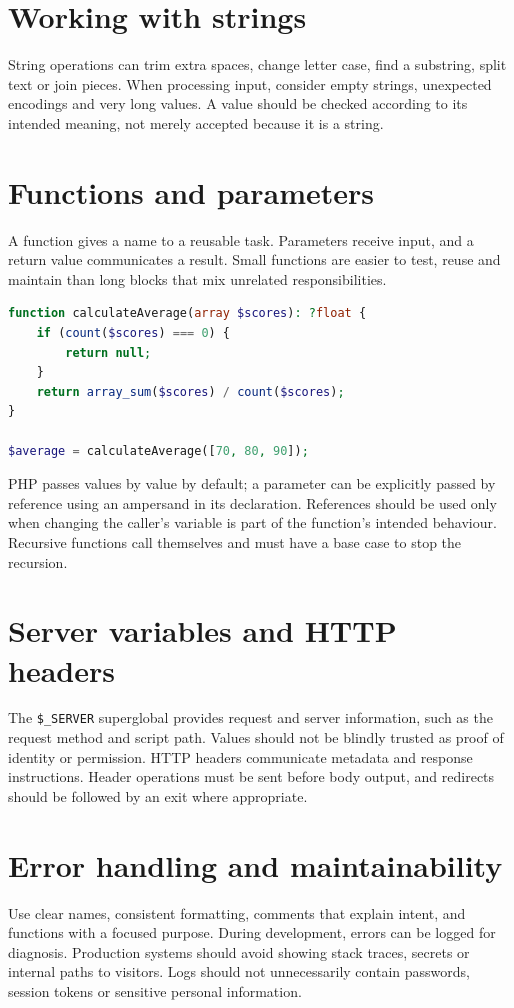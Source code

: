 \documentclass[11pt,openany,oneside]{book}
\begin{document}
\section{Working with strings}
String operations can trim extra spaces, change letter case, find a substring, split text or join pieces. When processing input, consider empty strings, unexpected encodings and very long values. A value should be checked according to its intended meaning, not merely accepted because it is a string.

\section{Functions and parameters}
A function gives a name to a reusable task. Parameters receive input, and a return value communicates a result. Small functions are easier to test, reuse and maintain than long blocks that mix unrelated responsibilities.

\begin{lstlisting}[style=webcode,language=PHP]
function calculateAverage(array $scores): ?float {
    if (count($scores) === 0) {
        return null;
    }
    return array_sum($scores) / count($scores);
}

$average = calculateAverage([70, 80, 90]);
\end{lstlisting}
PHP passes values by value by default; a parameter can be explicitly passed by reference using an ampersand in its declaration. References should be used only when changing the caller's variable is part of the function's intended behaviour. Recursive functions call themselves and must have a base case to stop the recursion.

\section{Server variables and HTTP headers}
The \texttt{\$\_SERVER} superglobal provides request and server information, such as the request method and script path. Values should not be blindly trusted as proof of identity or permission. HTTP headers communicate metadata and response instructions. Header operations must be sent before body output, and redirects should be followed by an exit where appropriate.

\section{Error handling and maintainability}
Use clear names, consistent formatting, comments that explain intent, and functions with a focused purpose. During development, errors can be logged for diagnosis. Production systems should avoid showing stack traces, secrets or internal paths to visitors. Logs should not unnecessarily contain passwords, session tokens or sensitive personal information.
\end{document}
